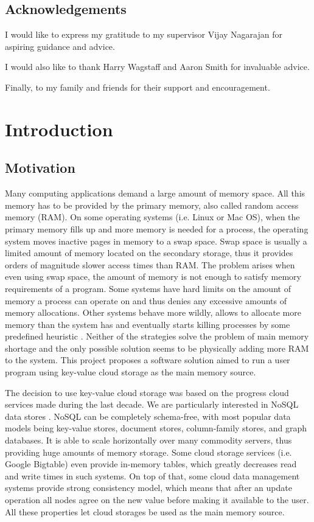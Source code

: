 \documentclass[bsc,frontabs,twoside,singlespacing,parskip,deptreport]{infthesis}     %
\begin{document}
\section*{Acknowledgements}

I would like to express my gratitude to my supervisor Vijay Nagarajan for aspiring guidance and advice.

I would also like to thank Harry Wagstaff and Aaron Smith for invaluable advice.

Finally, to my family and friends for their support and encouragement.

\tableofcontents



\chapter{Introduction}

\section{Motivation}

Many computing applications demand a large amount of memory space. All this memory has to be provided by the primary memory, also called random access memory (RAM). On some operating systems (i.e. Linux or Mac OS), when the primary memory fills up and more memory is needed for a process, the operating system moves inactive pages in memory to a swap space. Swap space is usually a limited amount of memory located on the secondary storage, thus it provides orders of magnitude slower access times than RAM. The problem arises when even using swap space, the amount of memory is not enough to satisfy memory requirements of a program. Some systems have hard limits on the amount of memory a process can operate on and thus denies any excessive amounts of memory allocations. Other systems behave more wildly, allows to allocate more memory than the system has and eventually starts killing processes by some predefined heuristic \citep{run_out_of_mem}. Neither of the strategies solve the problem of main memory shortage and the only possible solution seems to be physically adding more RAM to the system. This project proposes a software solution aimed to run a user program using key-value cloud storage as the main memory source.

The decision to use key-value cloud storage was based on the progress cloud services made during the last decade. We are particularly interested in NoSQL data stores \citep{nosql-data-stores}. NoSQL can be completely schema-free, with most popular data models being key-value stores, document stores, column-family stores, and graph databases. It is able to scale horizontally over many commodity servers, thus providing huge amounts of memory storage. Some cloud storage services (i.e. Google Bigtable) even provide in-memory tables, which greatly decreases read and write times in such systems.  On top of that, some cloud data management systems provide strong consistency model, which means that after an update operation all nodes agree on the new value before making it available to the user. All these properties let cloud storages be used as the main memory source.
\end{document}
